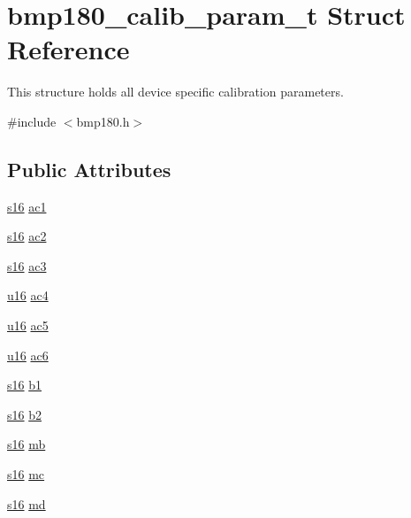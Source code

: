 \hypertarget{structbmp180__calib__param__t}{}\section{bmp180\+\_\+calib\+\_\+param\+\_\+t Struct Reference}
\label{structbmp180__calib__param__t}


This structure holds all device specific calibration parameters.  




{\ttfamily \#include $<$bmp180.\+h$>$}

\subsection*{Public Attributes}
\begin{DoxyCompactItemize}
\item 
\hyperlink{bmp180_8h_a4cb19f4a3324cfe0938ddfbfabaa825b}{s16} \hyperlink{structbmp180__calib__param__t_a4af824f7ed92cef41c2e591aff2ed3ba}{ac1}
\item 
\hyperlink{bmp180_8h_a4cb19f4a3324cfe0938ddfbfabaa825b}{s16} \hyperlink{structbmp180__calib__param__t_abe5534331e8ea703b759484322101e89}{ac2}
\item 
\hyperlink{bmp180_8h_a4cb19f4a3324cfe0938ddfbfabaa825b}{s16} \hyperlink{structbmp180__calib__param__t_ac5563e3a7ecbf6f0a991e04d87d01dd8}{ac3}
\item 
\hyperlink{bmp180_8h_aa0b167025ed1eead1300bc4dbdfb230e}{u16} \hyperlink{structbmp180__calib__param__t_a4f767b1a709975522476f90f58a054f4}{ac4}
\item 
\hyperlink{bmp180_8h_aa0b167025ed1eead1300bc4dbdfb230e}{u16} \hyperlink{structbmp180__calib__param__t_a89e488bc5c3c6496925d64a5e42be87a}{ac5}
\item 
\hyperlink{bmp180_8h_aa0b167025ed1eead1300bc4dbdfb230e}{u16} \hyperlink{structbmp180__calib__param__t_a7cd1f72878db3636b302794cc067dbce}{ac6}
\item 
\hyperlink{bmp180_8h_a4cb19f4a3324cfe0938ddfbfabaa825b}{s16} \hyperlink{structbmp180__calib__param__t_add43e571a34a76bc7e8c7e35f2b1d13d}{b1}
\item 
\hyperlink{bmp180_8h_a4cb19f4a3324cfe0938ddfbfabaa825b}{s16} \hyperlink{structbmp180__calib__param__t_ad3e1a7249a88d8eb5ea0d37e3e5137fb}{b2}
\item 
\hyperlink{bmp180_8h_a4cb19f4a3324cfe0938ddfbfabaa825b}{s16} \hyperlink{structbmp180__calib__param__t_a64bdabef2d55201e68ee49299b966282}{mb}
\item 
\hyperlink{bmp180_8h_a4cb19f4a3324cfe0938ddfbfabaa825b}{s16} \hyperlink{structbmp180__calib__param__t_a5abaaaa05802e6d9b2653182e31f655d}{mc}
\item 
\hyperlink{bmp180_8h_a4cb19f4a3324cfe0938ddfbfabaa825b}{s16} \hyperlink{structbmp180__calib__param__t_aab92deab6ac7b3bd24feda15460509c3}{md}
\end{DoxyCompactItemize}


